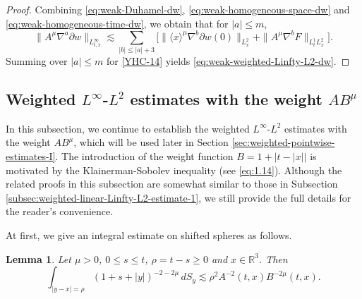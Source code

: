 \documentclass[11pt,twoside]{article}
\def\ls{\lesssim}
\theoremstyle{plain}
\newtheorem{lemma}[theorem]{Lemma}
\theoremstyle{definition}
\theoremstyle{assumption}
\numberwithin{equation}{section}
\begin{document}
\begin{proof}
				Combining \eqref{eq:weak-Duhamel-dw},
				\eqref{eq:weak-homogeneous-space-dw} and
				\eqref{eq:weak-homogeneous-time-dw}, we obtain that for \(|a|\le m\),
				\begin{equation}\label{YHC-14}
					\|A^\mu\nabla^a\partial w\|_{L^\infty_{t,x}}
					\ls
					\sum_{|b|\le |a|+3}
					\big[
					\|\langle x\rangle^\mu\nabla^b\partial w(0)\|_{L^2_x}
					+\|A^\mu\nabla^bF\|_{L^1_tL^2_x}
					\big].
				\end{equation}
				Summing over \(|a|\le m\) for \eqref{YHC-14} yields \eqref{eq:weak-weighted-Linfty-L2-dw}.
			\end{proof}
			
	
	
	
	
	\subsection{Weighted $L^\infty$-$L^2$ estimates with the weight $AB^{\mu}$}\label{subsec:weighted-linear-Linfty-L2-estimate-2}
	
	In this subsection, we continue to establish the weighted \(L^\infty\)-\(L^2\) estimates with the weight \(AB^\mu\),
 which will be used later in Section \ref{sec:weighted-pointwise-estimates-I}. The introduction of the weight
function $B=1+\bigl|t-|x|\bigr|$ is motivated by the Klainerman-Sobolev inequality (see \eqref{eq:1.14}). Although the related proofs in this subsection are somewhat similar to those in Subsection \ref{subsec:weighted-linear-Linfty-L2-estimate-1}, we still provide the
 full details for the reader's convenience.
	
	
	At first, we give an integral estimate on shifted spheres as follows.
	
	\begin{lemma}\label{lem:geom-sphere}
		Let $\mu>0$, $0\le s\le t$, $\rho=t-s\ge 0$ and $x\in\mathbb R^3$.
		Then
		\begin{equation}\label{eq:geom-sphere-equiv}
			\int_{|y-x|=\rho}
			(1+s+|y|)^{-2-2\mu}\,dS_y
			\ls
			\rho^2 A^{-2}(t,x)B^{-2\mu}(t,x).
		\end{equation}
	\end{lemma}
	
\end{document}
